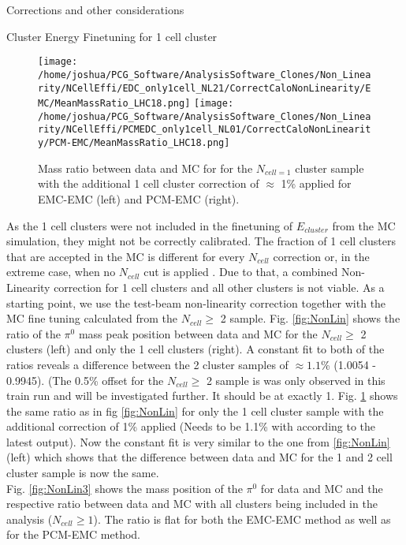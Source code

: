 \documentclass[ALICE]{ALICE_analysis_notes}
\newcommand{\PZ}{$\pi^0$\xspace}
\begin{document}
\begin{section}{Corrections and other considerations}
\begin{subsection}{Cluster Energy Finetuning for 1 cell cluster}
\begin{figure}[ht!]
	\centering
	\texttt{[image: /home/joshua/PCG\_Software/AnalysisSoftware\_Clones/Non\_Linearity/NCellEffi/EDC\_only1cell\_NL21/CorrectCaloNonLinearity/EMC/MeanMassRatio\_LHC18.png]}
	\texttt{[image: /home/joshua/PCG\_Software/AnalysisSoftware\_Clones/Non\_Linearity/NCellEffi/PCMEDC\_only1cell\_NL01/CorrectCaloNonLinearity/PCM-EMC/MeanMassRatio\_LHC18.png]}
	\caption{ Mass ratio between data and MC for for the $N_{cell = 1}$ cluster sample with the additional 1 cell cluster correction of $\approx$ 1\% applied for EMC-EMC (left) and PCM-EMC (right).}
	\label{fig:NonLin2}
\end{figure}



As the 1 cell clusters were not included in the finetuning of $E_{cluster}$ from the MC simulation, they might not be correctly calibrated. The fraction of 1 cell clusters that are accepted in the MC is different for every $N_{cell}$ correction or, in the extreme case, when no  $N_{cell}$ cut is applied . Due to that, a combined Non-Linearity correction for 1 cell clusters and all other clusters is not viable. As a starting point, we use the test-beam non-linearity correction together with the MC fine tuning calculated from the  $N_{cell} \geq$ 2 sample. Fig. \ref{fig:NonLin} shows the ratio of the $\pi^{0}$ mass peak position between data and MC for the $N_{cell} \geq$ 2 clusters (left) and only the 1 cell clusters (right). A constant fit to both of the ratios reveals a difference between the 2 cluster samples of $\approx 1.1$\% (1.0054 - 0.9945). (The 0.5\% offset for the $N_{cell} \geq$ 2 sample is was only observed in this train run and will be investigated further. It should be at exactly 1.
Fig. \ref{fig:NonLin2} shows the same ratio as in fig \ref{fig:NonLin} for only the 1 cell cluster sample with the additional correction of 1\% applied (Needs to be 1.1\% with according to the latest output). Now the constant fit is very similar to the one from \ref{fig:NonLin} (left) which shows that the difference between data and MC for the 1 and 2 cell cluster sample is now the same.\\
Fig. \ref{fig:NonLin3} shows the mass position of the \PZ for data and MC and the respective ratio between data and MC with all clusters being included in the analysis ($N_{cell} \geq 1$). The ratio is flat for both the EMC-EMC method as well as for the PCM-EMC method.

\end{subsection}
\end{section}
\end{document}
